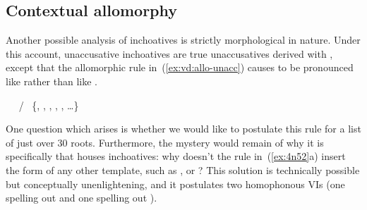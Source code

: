 \begin{exe}
\begin{xlist}
\begin{xlist}
\begin{exe}
\begin{exe}
\begin{xlist}
\begin{exe}
\begin{xlist}
\begin{exe}
\begin{xlist}
\begin{xlist}
\begin{exe}
\begin{xlist}
\begin{exe}
\begin{xlist}
\begin{exe}
\begin{xlist}
\begin{exe}
\begin{exe}
\begin{exe}
\begin{xlist}
\begin{exe}
\begin{exe}
\begin{xlist}
\begin{xlist}
\begin{exe}
\begin{xlist}
\begin{exe}
\begin{exe}
\begin{xlist}
\begin{exe}
\begin{exe}
\begin{xlist}
\begin{exe}
\begin{xlist}
\begin{exe}
\begin{xlist}
\begin{exe}
\begin{xlist}
\begin{exe}
\begin{exe}
\begin{xlist}
\begin{exe}
\begin{exe}
\begin{xlist}
\begin{xlist}
\begin{exe}
\begin{xlist}
\begin{xlist}
\begin{exe}
\begin{xlist}
\begin{exe}
\begin{xlist}
\begin{exe}
\begin{xlist}
\begin{exe}
\begin{xlist}
\begin{exe}
\begin{exe}
\begin{exe}
\begin{exe}
\begin{xlist}
\begin{exe}
\begin{exe}
\begin{xlist}
\begin{xlist}
\begin{exe}
\begin{exe}
\begin{xlist}
\begin{exe}
\begin{xlist}
\begin{exe}
\begin{xlist}
	\subsection{Contextual allomorphy}
Another possible analysis of inchoatives is strictly morphological in nature. Under this account, unaccusative inchoatives are true unaccusatives derived with {\vz}, except that the allomorphic rule in~(\ref{ex:vd:allo-unacc}) causes {\vz} to be pronounced like {\thif} rather than like {\tnif}.

 \begin{exe}
 \ex  \label{ex:4n52}
 \begin{xlist} 
   \ex  \vz~\lra~{\thif} / \trace~\{, , , , , \dots \}\label{ex:vd:allo-unacc} 
   \ex  \vz~\lra~{\tnif} 
 \z
\z 

One question which arises is whether we would like to postulate this rule for a list of just over 30 roots. Furthermore, the mystery would remain of why it is specifically {\thif} that houses inchoatives: why doesn't the rule in~(\ref{ex:4n52}a) insert the form of any other template, such as {\tkal}, {\tnif} or {\tpie}? This solution is technically possible but conceptually unenlightening, and it postulates two homophonous VIs {\thif} (one spelling out {\vd} and one spelling out {\vz}).


\end{xlist}
\end{exe}
\end{xlist}
\end{exe}
\end{xlist}
\end{exe}
\end{xlist}
\end{exe}
\end{exe}
\end{xlist}
\end{xlist}
\end{exe}
\end{exe}
\end{xlist}
\end{exe}
\end{exe}
\end{exe}
\end{exe}
\end{xlist}
\end{exe}
\end{xlist}
\end{exe}
\end{xlist}
\end{exe}
\end{xlist}
\end{exe}
\end{xlist}
\end{xlist}
\end{exe}
\end{xlist}
\end{xlist}
\end{exe}
\end{exe}
\end{xlist}
\end{exe}
\end{exe}
\end{xlist}
\end{exe}
\end{xlist}
\end{exe}
\end{xlist}
\end{exe}
\end{xlist}
\end{exe}
\end{exe}
\end{xlist}
\end{exe}
\end{exe}
\end{xlist}
\end{exe}
\end{xlist}
\end{xlist}
\end{exe}
\end{exe}
\end{xlist}
\end{exe}
\end{exe}
\end{exe}
\end{xlist}
\end{exe}
\end{xlist}
\end{exe}
\end{xlist}
\end{exe}
\end{xlist}
\end{xlist}
\end{exe}
\end{xlist}
\end{exe}
\end{xlist}
\end{exe}
\end{exe}
\end{xlist}
\end{xlist}
\end{exe}
